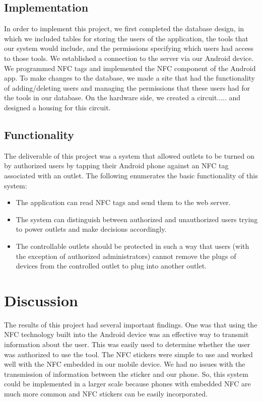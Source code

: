 \documentclass{sigchi}
\begin{document}
\subsection{Implementation}
In order to implement this project, we first completed the database design, in which we included tables for storing the users of the application, the tools that our system would include, and the permissions specifying which users had access to those tools. 
We established a connection to the server via our Android device.
We programmed NFC tags and implemented the NFC component of the Android app.
To make changes to the database, we made a site that had the functionality of adding/deleting users and managing the permissions that these users had for the tools in our database.
On the hardware side, we created a circuit..... and designed a housing for this circuit.

\subsection {Functionality}
The deliverable of this project was a system that allowed outlets to be turned on by authorized users by tapping their Android phone against an NFC tag associated with an outlet. The following enumerates the basic functionality of this system:
\begin{itemize}
\item The application can read NFC tags and send them to the web server.

\item The system can distinguish between authorized and unauthorized users trying to power outlets and make decisions accordingly. 

\item The controllable outlets should be protected in such a way that users (with the exception of authorized administrators) cannot remove the plugs of devices from the controlled outlet to plug into another outlet.
\end{itemize}

\section{Discussion}

The results of this project had several important findings. One was that using the NFC technology built into the Android device was an effective way to transmit information about the user. This was easily used to determine whether the user was authorized to use the tool. The NFC stickers were simple to use and worked well with the NFC embedded in our mobile device. We had no issues with the transmission of information between the sticker and our phone. So, this system could be implemented in a larger scale because phones with embedded NFC are much more common and NFC stickers can be easily incorporated.
\end{document}
